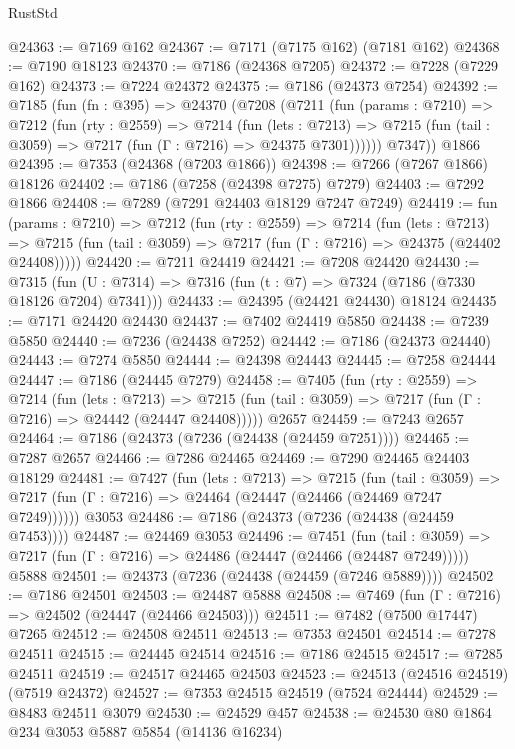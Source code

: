 \begin{lexlean}{RustStd}
\begin{coremodule}
{\begin{coremodule}
{{{{{{{{{{{{{{{{{{{{{{{{{{{{{{{{@24363 := @7169 @162
@24367 := @7171 (@7175 @162) (@7181 @162)
@24368 := @7190 @18123
@24370 := @7186 (@24368 @7205)
@24372 := @7228 (@7229 @162)
@24373 := @7224 @24372
@24375 := @7186 (@24373 @7254)
@24392 := @7185
    (fun (fn : @395) =>
    @24370
      (@7208
        (@7211
          (fun (params : @7210) =>
          @7212
            (fun (rty : @2559) =>
            @7214
              (fun (lets : @7213) =>
              @7215 (fun (tail : @3059) => @7217 (fun (Γ : @7216) => @24375 @7301))))))
        @7347))
    @1866
@24395 := @7353 (@24368 (@7203 @1866))
@24398 := @7266 (@7267 @1866) @18126
@24402 := @7186 (@7258 (@24398 @7275) @7279)
@24403 := @7292 @1866
@24408 := @7289 (@7291 @24403 @18129 @7247 @7249)
@24419 := fun (params : @7210) =>
  @7212
    (fun (rty : @2559) =>
    @7214
      (fun (lets : @7213) =>
      @7215 (fun (tail : @3059) => @7217 (fun (Γ : @7216) => @24375 (@24402 @24408)))))
@24420 := @7211 @24419
@24421 := @7208 @24420
@24430 := @7315
    (fun (U : @7314) => @7316 (fun (t : @7) => @7324 (@7186 (@7330 @18126 @7204) @7341)))
@24433 := @24395 (@24421 @24430) @18124
@24435 := @7171 @24420 @24430
@24437 := @7402 @24419 @5850
@24438 := @7239 @5850
@24440 := @7236 (@24438 @7252)
@24442 := @7186 (@24373 @24440)
@24443 := @7274 @5850
@24444 := @24398 @24443
@24445 := @7258 @24444
@24447 := @7186 (@24445 @7279)
@24458 := @7405
    (fun (rty : @2559) =>
    @7214
      (fun (lets : @7213) =>
      @7215 (fun (tail : @3059) => @7217 (fun (Γ : @7216) => @24442 (@24447 @24408)))))
    @2657
@24459 := @7243 @2657
@24464 := @7186 (@24373 (@7236 (@24438 (@24459 @7251))))
@24465 := @7287 @2657
@24466 := @7286 @24465
@24469 := @7290 @24465 @24403 @18129
@24481 := @7427
    (fun (lets : @7213) =>
    @7215
      (fun (tail : @3059) =>
      @7217 (fun (Γ : @7216) => @24464 (@24447 (@24466 (@24469 @7247 @7249))))))
    @3053
@24486 := @7186 (@24373 (@7236 (@24438 (@24459 @7453))))
@24487 := @24469 @3053
@24496 := @7451
    (fun (tail : @3059) => @7217 (fun (Γ : @7216) => @24486 (@24447 (@24466 (@24487 @7249)))))
    @5888
@24501 := @24373 (@7236 (@24438 (@24459 (@7246 @5889))))
@24502 := @7186 @24501
@24503 := @24487 @5888
@24508 := @7469 (fun (Γ : @7216) => @24502 (@24447 (@24466 @24503)))
@24511 := @7482 (@7500 @17447) @7265
@24512 := @24508 @24511
@24513 := @7353 @24501
@24514 := @7278 @24511
@24515 := @24445 @24514
@24516 := @7186 @24515
@24517 := @7285 @24511
@24519 := @24517 @24465 @24503
@24523 := @24513 (@24516 @24519) (@7519 @24372)
@24527 := @7353 @24515 @24519 (@7524 @24444)
@24529 := @8483 @24511 @3079
@24530 := @24529 @457
@24538 := @24530 @80 @1864 @234 @3053 @5887 @5854 (@14136 @16234)
}}}}}}}}}}}}}}}}}}}}}}}}}}}}}}}}
\end{coremodule}}
\end{coremodule}
\end{lexlean}

